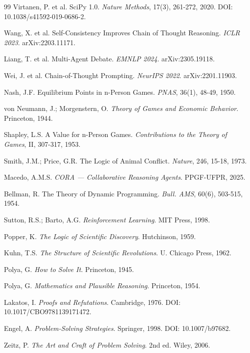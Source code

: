 \documentclass[5p]{elsarticle}
\begin{document}
\begin{thebibliography}{99}
Virtanen, P. et al. SciPy 1.0. \textit{Nature Methods}, 17(3), 261-272, 2020. DOI: 10.1038/s41592-019-0686-2.

Wang, X. et al. Self-Consistency Improves Chain of Thought Reasoning. \textit{ICLR 2023}. arXiv:2203.11171.

Liang, T. et al. Multi-Agent Debate. \textit{EMNLP 2024}. arXiv:2305.19118.

Wei, J. et al. Chain-of-Thought Prompting. \textit{NeurIPS 2022}. arXiv:2201.11903.

Nash, J.F. Equilibrium Points in n-Person Games. \textit{PNAS}, 36(1), 48-49, 1950.

von Neumann, J.; Morgenstern, O. \textit{Theory of Games and Economic Behavior}. Princeton, 1944.

Shapley, L.S. A Value for n-Person Games. \textit{Contributions to the Theory of Games}, II, 307-317, 1953.

Smith, J.M.; Price, G.R. The Logic of Animal Conflict. \textit{Nature}, 246, 15-18, 1973.

Macedo, A.M.S. \textit{CORA — Collaborative Reasoning Agents}. PPGF-UFPR, 2025.

Bellman, R. The Theory of Dynamic Programming. \textit{Bull. AMS}, 60(6), 503-515, 1954.

Sutton, R.S.; Barto, A.G. \textit{Reinforcement Learning}. MIT Press, 1998.

Popper, K. \textit{The Logic of Scientific Discovery}. Hutchinson, 1959.

Kuhn, T.S. \textit{The Structure of Scientific Revolutions}. U. Chicago Press, 1962.

Polya, G. \textit{How to Solve It}. Princeton, 1945.

Polya, G. \textit{Mathematics and Plausible Reasoning}. Princeton, 1954.

Lakatos, I. \textit{Proofs and Refutations}. Cambridge, 1976. DOI: 10.1017/CBO9781139171472.

Engel, A. \textit{Problem-Solving Strategies}. Springer, 1998. DOI: 10.1007/b97682.

Zeitz, P. \textit{The Art and Craft of Problem Solving}. 2nd ed. Wiley, 2006.


\end{thebibliography}
\end{document}

